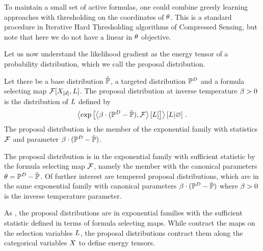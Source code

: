 \begin{remark}
    To maintain a small set of active formulas, one could combine greedy learning approaches with thresholding on the coordinates of $\theta$.
    This is a standard procedure in Iterative Hard Thresholding algorithms of Compressed Sensing, but note that here we do not have a linear in $\theta$ objective.
\end{remark}






Let us now understand the likelihood gradient as the energy tensor of a probability distribution, which we call the proposal distribution.

\begin{definition}
    Let there be a base distribution $\tilde{\mathbb{P}}$, a targeted distribution $\mathbb{P}^{D}$ and a formula selecting map $\mathcal{F}[X_{[d]}, L]$.
    The proposal distribution at inverse temperature $\beta>0$ is the distribution of $L$ defined by
    \begin{align*}
        \left\langle \mathrm{exp}\left[\left\langle \beta\cdot(\mathbb{P}^{D}-\tilde{\mathbb{P}}),\mathcal{F}\right\rangle \left[ L \right]\right] \right\rangle \left[ L | \varnothing \right] \, .
    \end{align*}
    The proposal distribution is the member of the exponential family with statistics $\mathcal{F}$ and parameter $\beta\cdot(\mathbb{P}^{D}-\tilde{\mathbb{P}})$.
\end{definition}


The proposal distribution is in the exponential family with sufficient statistic by the formula selecting map $\mathcal{F}$, namely the member with the canonical parameters $\theta=\mathbb{P}^{D}-\tilde{\mathbb{P}}$.
Of further interest are tempered proposal distributions, which are in the same exponential family with canonical parameters $\beta\cdot(\mathbb{P}^{D}-\tilde{\mathbb{P}})$ where $\beta>0$ is the inverse temperature parameter.

As \MarkovLogicNetworks{}, the proposal distributions are in exponential families with the sufficient statistic defined in terms of formula selecting maps.
While \MarkovLogicNetworks{} contract the maps on the selection variables $L$, the proposal distributions contract them along the categorical variables $X$ to define energy tensors.

